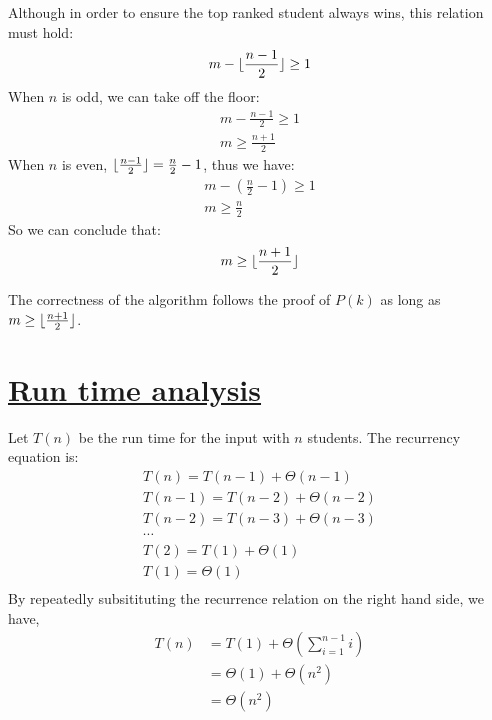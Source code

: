 \documentclass[11pt]{article}
\DeclarePairedDelimiter\floor{\lfloor}{\rfloor}
\begin{document}
Although in order to ensure the top ranked student always wins, this
relation must hold:
\begin{equation}
  m - \floor{\frac{n-1}{2}} \geq 1
\end{equation}
When $n$ is odd, we can take off the floor:
\begin{equation}
\begin{split}
  m - \frac{n-1}{2} \geq 1\\
  m  \geq \frac{n+1}{2}
\end{split}
\end{equation}
When $n$ is even, $\floor{\frac{n-1}{2}} = \frac{n}{2}-1$, thus we have:
\begin{equation}
\begin{split}
  m -  (\frac{n}{2}-1)\geq 1\\
  m  \geq \frac{n}{2}
\end{split}
\end{equation}
So we can conclude that:
\begin{equation}
  m  \geq \floor{\frac{n+1}{2}}
\end{equation}

The correctness of the algorithm follows the proof of $P(k)$ as long
as $m \geq \floor{\frac{n+1}{2}}$.

\section*{\underline{Run time analysis}}
Let $T(n)$ be the run time for the input with $n$ students. The
recurrency equation is:
\begin{equation}
\begin{split}
  T(n) = T(n-1) + \Theta(n-1)\\
  T(n-1) = T(n-2) + \Theta(n-2)\\
  T(n-2) = T(n-3) + \Theta(n-3)\\
  \cdots\\
  T(2) = T(1) + \Theta(1)\\
  T(1) = \Theta(1)\\
\end{split}
\end{equation}
By repeatedly subsitituting the recurrence relation on the right hand
side, we have,
\begin{equation}
\begin{split}
  T(n) &= T(1) + \Theta(\sum_{i=1}^{n-1} i)\\
  &= \Theta(1) + \Theta(n^2)\\
  &= \Theta(n^2)\\
\end{split}
\end{equation}
\end{document}
